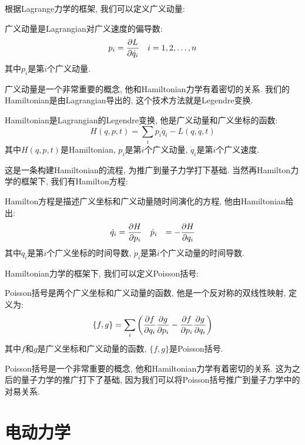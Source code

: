 根据Lagrange力学的框架, 我们可以定义广义动量:
\begin{definition}[][广义动量]
  广义动量是Lagrangian对广义速度的偏导数:
  \begin{equation}
    p_i = \pdv{L}{\dot{q}_i}  \quad i=1, 2, \ldots, n
  \end{equation}
  其中$p_i$是第$i$个广义动量.
\end{definition}
广义动量是一个非常重要的概念, 他和Hamiltonian力学有着密切的关系.
我们的Hamiltonian是由Lagrangian导出的, 这个技术方法就是Legendre变换.
\begin{definition}[][Hamiltonian]
  Hamiltonian是Lagrangian的Legendre变换, 他是广义动量和广义坐标的函数:
  \begin{equation}
    H(q, p, t) = \sum_i p_i \dot{q}_i - L(q, \dot{q}, t)
  \end{equation}
  其中$H(q, p, t)$是Hamiltonian, $p_i$是第$i$个广义动量, $\dot{q}_i$是第$i$个广义速度.
\end{definition}
这是一条构建Hamiltonian的流程, 为推广到量子力学打下基础.
当然再Hamilton力学的框架下, 我们有Hamilton方程:
\begin{theorem}[][Hamilton方程]
Hamilton方程是描述广义坐标和广义动量随时间演化的方程, 他由Hamiltonian给出:
\begin{equation}
\begin{aligned}
  \dot{q}_i &= \pdv{H}{p_i} \quad \dot{p}_i &= -\pdv{H}{q_i}
\end{aligned}
\end{equation}
其中$\dot{q}_i$是第$i$个广义坐标的时间导数, $\dot{p}_i$是第$i$个广义动量的时间导数.
\end{theorem}
Hamiltonian力学的框架下, 我们可以定义Poisson括号:
\begin{definition}[][Poisson括号]
  Poisson括号是两个广义坐标和广义动量的函数,
  他是一个反对称的双线性映射, 定义为:
  \begin{equation}
    \{f, g\} = \sum_i \left( \pdv{f}{q_i} \pdv{g}{p_i} - \pdv{f}{p_i} \pdv{g}{q_i} \right)
  \end{equation}
  其中$f$和$g$是广义坐标和广义动量的函数, $\{f, g\}$是Poisson括号.
\end{definition}
Poisson括号是一个非常重要的概念, 他和Hamiltonian力学有着密切的关系.
这为之后的量子力学的推广打下了基础, 因为我们可以将Poisson括号推广到量子力学中的对易关系.
\newpage
\section{电动力学}
\label{CH1 S Electrodynamics}

